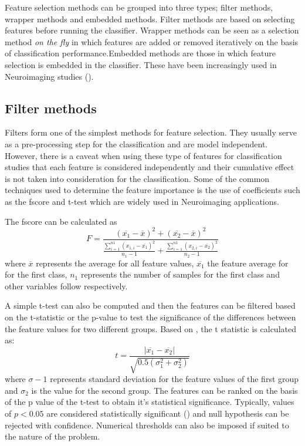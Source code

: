 \documentclass[msthesis.tex]{subfiles}
\begin{document}
Feature selection methods can be grouped into three types; filter methods, wrapper methods and embedded methods. Filter methods are based on selecting features before running the classifier. Wrapper methods can be seen as a selection method \textit{on the fly} in which features are added or removed iteratively on the basis of classification performance.Embedded methods are those in which feature selection is embedded in the classifier. These have been increasingly used in Neuroimaging studies (\cite{tohka2016comparison}).

\subsection{Filter methods}
\label{subsec:filtermethods}
Filters form one of the simplest methods for feature selection. They usually serve as a pre-processing step for the classification and are model independent. However, there is a caveat when using these type of features for classification studies that each feature is considered independently and their cumulative effect is not taken into consideration for the classification. Some of the common techniques used to determine the feature importance is the use of coefficients such as the fscore and t-test which are widely used in Neuroimaging applications.

The fscore can be calculated as 
\begin{equation}
\label{eq:fscores}
    F = \frac{(\overline{x_{1}} - \overline{x})^2 + (\overline{x_{2}} - \overline{x})^2}
    {\frac{\sum_{i=1}^{n1}(x_{1,i} - \overline{x_{1}})^2}{n_{1} -1} + \frac{\sum_{i=1}^{n1}(x_{2,i} - \overline{x_{2}})^2}{n_{2} -1}}
\end{equation}
where $\overline{x}$ represents the average for all feature values, $\overline{x_{1}}$ the feature average for for the first class, $n_{1}$ represents the number of samples for the first class and other variables follow respectively.

A simple t-test can also be computed and then the features can be filtered based on the t-statistic or the p-value to test the significance of the differences between the feature values for two different groups. Based on \cite{inza2004filter}, the t statistic is calculated as:
\begin{equation}
    t = \frac{|\overline{x_1} - \overline{x_2}|}{\sqrt{0.5(\sigma_{1}^2 + \sigma_{2}^2)}}
\end{equation}
where $\sigma-{1}$ represents standard deviation for the feature values of the first group and $\sigma_{2}$ is the value for the second group. 
The features can be ranked on the basis of the p value of the t-test to obtain it's statistical significance. Typically, values of $p<0.05$ are considered statistically significant (\cite{colquhoun2017reproducibility}) and null hypothesis can be rejected with confidence. Numerical thresholds can also be imposed if suited to the nature of the problem. 
\end{document}
